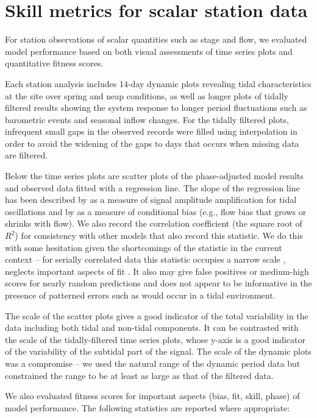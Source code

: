 \section{Skill metrics for scalar station data}
For station observations of scalar quantities such as stage and flow, 
we evaluated model performance based on both visual assessments of time series plots and 
quantitative fitness scores. 

Each station analysis includes 14-day dynamic plots revealing tidal characteristics 
at the site over spring and neap conditions, as well as longer plots of tidally filtered results showing the
system response to longer period fluctuations such as barometric events and seasonal
inflow changes. For the tidally filtered plots, infrequent small gaps 
in the observed records were filled using interpolation in order to avoid the widening 
of the gaps to days that occurs when missing data are filtered. 

Below the time series plots are scatter plots of the phase-adjusted model results 
and observed data fitted with a regression line. The slope of the regression line has been
described by \cite{MacWilliams08} as a measure of signal amplitude amplification for tidal oscillations
and by \cite{Murphy88} as a measure of conditional bias (e.g., flow bias that grows or shrinks with flow).  
We also record the correlation coefficient (the square root of ${R^2}$) for consistency with other models
that also record this statistic. We do this with some hesitation given the shortcomings of the statistic in the current context
-- for serially correlated data this statistic occupies a narrow scale \cite{Ralston2006}, neglects important aspects of fit
\citep{Murphy88}. It also may give false positives or medium-high scores for nearly random predictions \citep{Ralston2006}
and does not appear to be informative in the presence of patterned errors such as would occur in a tidal environment. 

The scale of the scatter plots gives a good indicator of the total variability in the data 
including both tidal and non-tidal components. It can be contrasted with the scale of the 
tidally-filtered time series plots, whose y-axis is a good indicator of the variability of
the subtidal part of the signal. The scale of the dynamic plots was a compromise -- we used the 
natural range of the dynamic period data but constrained the range to be at least as large 
as that of the filtered data. 

We also evaluated fitness scores for important aspects (bias, fit, skill, phase) of 
model performance. The following statistics are reported where
appropriate:


